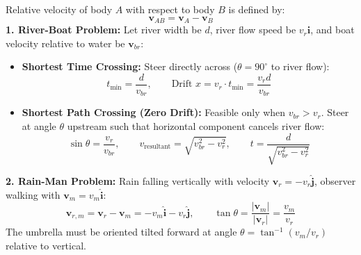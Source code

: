 \documentclass[10pt,a4paper]{article}
\begin{document}
\begin{formulabox}
Relative velocity of body $A$ with respect to body $B$ is defined by:
\begin{equation}
  \mathbf{v}_{AB} = \mathbf{v}_A - \mathbf{v}_B
\end{equation}
\textbf{1. River-Boat Problem:} Let river width be $d$, river flow speed be $v_r\hat{\mathbf{i}}$, and boat velocity relative to water be $\mathbf{v}_{br}$:
\begin{itemize}
  \item \textbf{Shortest Time Crossing:} Steer directly across ($\theta = 90^\circ$ to river flow):
  \begin{equation}
    t_{\min} = \frac{d}{v_{br}}, \qquad \text{Drift } x = v_r \cdot t_{\min} = \frac{v_r d}{v_{br}}
  \end{equation}
  \item \textbf{Shortest Path Crossing (Zero Drift):} Feasible only when $v_{br} > v_r$. Steer at angle $\theta$ upstream such that horizontal component cancels river flow:
  \begin{equation}
    \sin\theta = \frac{v_r}{v_{br}}, \qquad v_{\text{resultant}} = \sqrt{v_{br}^2 - v_r^2}, \qquad t = \frac{d}{\sqrt{v_{br}^2 - v_r^2}}
  \end{equation}
\end{itemize}
\textbf{2. Rain-Man Problem:} Rain falling vertically with velocity $\mathbf{v}_r = -v_r\hat{\mathbf{j}}$, observer walking with $\mathbf{v}_m = v_m\hat{\mathbf{i}}$:
\begin{equation}
  \mathbf{v}_{r,m} = \mathbf{v}_r - \mathbf{v}_m = -v_m\hat{\mathbf{i}} - v_r\hat{\mathbf{j}}, \qquad \tan\theta = \frac{|\mathbf{v}_m|}{|\mathbf{v}_r|} = \frac{v_m}{v_r}
\end{equation}
The umbrella must be oriented tilted forward at angle $\theta = \tan^{-1}(v_m/v_r)$ relative to vertical.
\end{formulabox}
\end{document}
